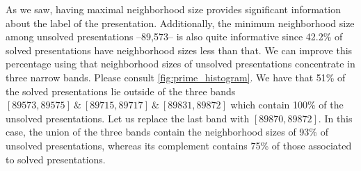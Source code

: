 
As we saw, having maximal neighborhood size provides significant information about the label of the presentation.
Additionally, the minimum neighborhood size among unsolved presentations --89,573-- is also quite informative since 42.2\% of solved presentations have neighborhood sizes less than that.
We can improve this percentage using that neighborhood sizes of unsolved presentations concentrate in three narrow bands. Please consult \cref{fig:prime_histogram}.
We have that 51\% of the solved presentations lie outside of the three bands $[89573, 89575]\ \& \ [89715, 89717]\ \& \ [89831, 89872]$ which contain 100\% of the unsolved presentations.
Let us replace the last band with $[89870, 89872]$.
In this case, the union of the three bands contain the neighborhood sizes of 93\% of unsolved presentations, whereas its complement contains 75\% of those associated to solved presentations.

